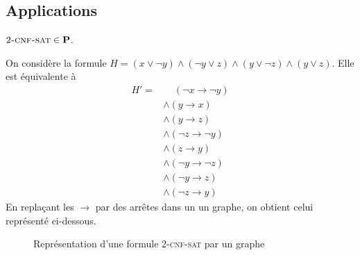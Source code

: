 \subsection{Applications}

\begin{thm}
	$2\textsc{-cnf-sat} \in \text{\textbf{P}}$.
\end{thm}

\begin{exm}
	On considère la formule $H = (x \lor \lnot y) \land (\lnot y \lor z) \land (y \lor \lnot z) \land(y \lor z)$. Elle est équivalente à 
	\begin{align*}
		H' = &\mathbin{\phantom\land}  (\lnot x \to \lnot y)\\
		&\land (y \to x)\\
		&\land (y \to z)\\
		&\land (\lnot z \to \lnot y)\\
		&\land (z \to y)\\
		&\land (\lnot y \to \lnot z)\\
		&\land (\lnot y \to z)\\
		&\land (\lnot z \to y)
	\end{align*}
	En replaçant les $\to $\/ par des arrêtes dans un un graphe, on obtient celui représenté ci-dessous.
\end{exm}

\begin{figure}[H]
	\centering
	\caption{Représentation d'une formule $2$-\textsc{cnf-sat} par un graphe}
\end{figure}

